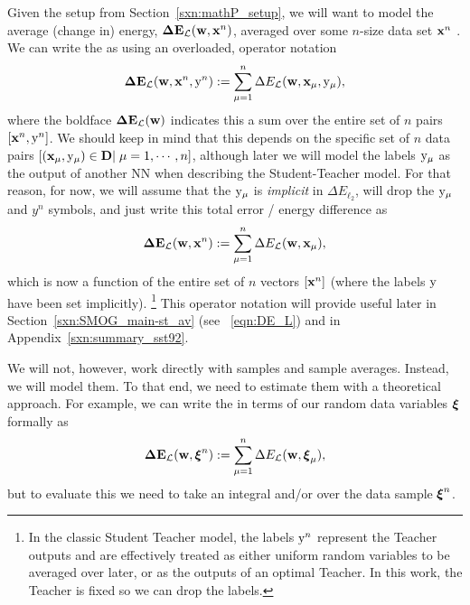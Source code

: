 Given the setup from Section~\ref{sxn:mathP_setup},
we will want to model the average (change in) energy,  $\mathbf{\Delta {E}}_{\mathcal{L}}(\mathbf{w}, \mathbf{x}^{n})$, averaged over some $n$-size data set $\mathbf{x}^{n}$ .
We can write the \TotalDataSampleError as
using an overloaded, operator notation 
\begin{align}
  \label{eqn:detopxy}
  \mathbf{\Delta {E}}_{\mathcal{L}}(\mathbf{w}, \mathbf{x}^{n}, \mathrm{y}^{n}) :=\sum_{\mu=1}^{n}\Delta E_{\mathcal{L}}({\mathbf{w}},{\mathbf{x}}_{\mu}, \mathrm{y}_{\mu})  ,
\end{align}
where the boldface $\mathbf{\Delta {E}}_{\mathcal{L}}(\mathbf{w})$ indicates this a sum over the entire set of  $n$ pairs $[\mathbf{x}^{n}, \mathrm{y}^{n}]$.
We should keep in mind that this depends on the specific set of $n$ data pairs
$[({\mathbf{x}}_{\mu},\mathrm{y}_{\mu})\in\mathbf{D}|\;\mu=1,\cdots,n]$, 
although later we will model the labels $\mathrm{y}_{\mu}$ as the output of another NN
when describing the Student-Teacher model.
%
For that reason, for now, we
will assume that the $\mathrm{y}_{\mu}$ is \emph{implicit} in $\Delta E_{\ell_2}$,
will drop the $\mathrm{y}_{\mu}$ and $y^{n}$ symbols, 
and just write this total error / energy difference as
\begin{align}
  \label{eqn:detox_FIXLATER}
  \mathbf{\Delta {E}}_{\mathcal{L}}(\mathbf{w}, \mathbf{x}^{n}) :=\sum_{\mu=1}^{n}\Delta E_{\mathcal{L}}({\mathbf{w}},{\mathbf{x}}_{\mu})  ,
\end{align}
which is now a function of the entire set of  $n$ vectors $[\mathbf{x}^{n}]$
(where the labels $\mathrm{y}$ have been set implicitly).
\footnote{In the classic Student Teacher model, the labels  $\mathrm{y}^{n}$ represent the Teacher outputs and are effectively treated as either uniform random variables to be averaged over later, or as the outputs of an optimal Teacher. In this work, the Teacher is fixed so we can drop the labels.}
This operator notation will provide useful later in Section~\ref{sxn:SMOG_main-st_av}
(see \EQN~\ref{eqn:DE_L}) and in Appendix~\ref{sxn:summary_sst92}.

We will not, however, work directly with samples and sample averages.
Instead, we will model them.
To that end, we need to estimate them with a theoretical approach.
For example, we can write the \TotalDataSampleError in terms of our random data variables $\boldsymbol{\xi}$ formally as
\begin{align}
\label{eqn:tdse}
\mathbf{\Delta {E}}_{\mathcal{L}}(\mathbf{w}, \boldsymbol{\xi}^{n}) := \sum_{\mu=1}^{n}\Delta E_{\mathcal{L}}(\mathbf{w},\boldsymbol{\xi}_{\mu}) ,
\end{align}
but to evaluate this we need to take an integral and/or \ExpectedValue over the data sample $\boldsymbol{\xi}^{n}$.

